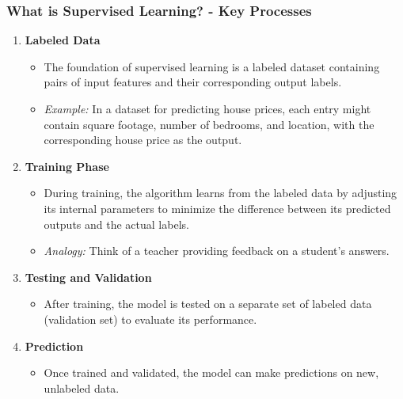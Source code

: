 \documentclass[aspectratio=169]{beamer}
\begin{document}
\begin{frame}[fragile]
    \frametitle{What is Supervised Learning? - Key Processes}
    \begin{enumerate}
        \item \textbf{Labeled Data}
            \begin{itemize}
                \item The foundation of supervised learning is a labeled dataset containing pairs of input features and their corresponding output labels.
                \item \textit{Example:} In a dataset for predicting house prices, each entry might contain square footage, number of bedrooms, and location, with the corresponding house price as the output.
            \end{itemize}
        
        \item \textbf{Training Phase}
            \begin{itemize}
                \item During training, the algorithm learns from the labeled data by adjusting its internal parameters to minimize the difference between its predicted outputs and the actual labels.
                \item \textit{Analogy:} Think of a teacher providing feedback on a student's answers.
            \end{itemize}

        \item \textbf{Testing and Validation}
            \begin{itemize}
                \item After training, the model is tested on a separate set of labeled data (validation set) to evaluate its performance.
            \end{itemize}
        
        \item \textbf{Prediction}
            \begin{itemize}
                \item Once trained and validated, the model can make predictions on new, unlabeled data.
            \end{itemize}
    \end{enumerate}
\end{frame}
\end{document}
